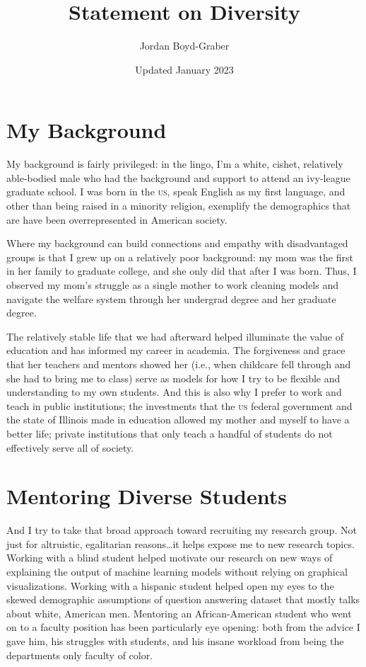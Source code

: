 \documentclass[11pt]{amsart}
\newcommand{\abr}[1]{\textsc{#1}}
\begin{document}
 \title{Statement on Diversity}

 \author{Jordan Boyd-Graber}
\address{University of Maryland}

\date{Updated January 2023}


\keywords{}

\maketitle

\section{My Background}

My background is fairly privileged: in the lingo, I'm a white, cishet,
relatively able-bodied male who had the background and support to attend an ivy-league graduate school.
%
I was born in the \abr{us}, speak English as my first language, and
other than being raised in a minority religion, exemplify the
demographics that are have been overrepresented in American society.

Where my background can build connections and empathy with
disadvantaged groups is that I grew up on a relatively poor
background: my mom was the first in her family to graduate college,
and she only did that after I was born.
%
Thus, I observed my mom's struggle as a single mother to work cleaning
models and navigate the welfare system through her undergrad degree
and her graduate degree.

The relatively stable life that we had afterward helped illuminate the
value of education and has informed my career in academia.
%
The forgiveness and grace that her teachers and mentors showed her
(i.e., when childcare fell through and she had to bring me to class)
serve as models for how I try to be flexible and understanding to my
own students.
%
And this is also why I prefer to work and teach in public
institutions; the investments that the \abr{us} federal government and
the state of Illinois made in education allowed my mother and myself
to have a better life; private institutions that only teach a handful
of students do not effectively serve all of society.

\section{Mentoring Diverse Students}

And I try to take that broad approach toward recruiting my research
group.
%
Not just for altruistic, egalitarian reasons\dots it helps expose me
to new research topics.
%
Working with a blind student helped motivate our research on new ways
of explaining the output of machine learning models without relying on
graphical visualizations.
%
Working with a hispanic student helped open my eyes to the skewed
demographic assumptions of question answering dataset that mostly
talks about white, American men.
%
Mentoring an African-American student who went on to a faculty
position has been particularly eye opening: both from the advice I
gave him, his struggles with students, and his insane workload from
being the departments only faculty of color.
\end{document}
